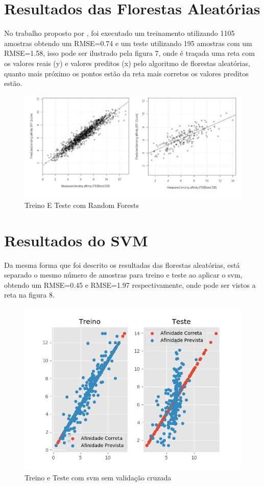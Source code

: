 \documentclass[tcc, capa]{texucpel}
\begin{document}
\section{Resultados das Florestas Aleatórias}

No trabalho proposto por \textbf{\cite{ballester2010machine}}, foi executado um treinamento utilizando 1105 amostras obtendo um RMSE=0.74 e um teste utilizando 195 amostras com um RMSE=1.58, isso pode ser ilustrado pela figura 7, onde é traçada uma reta com os valores reais (y) e valores preditos (x) pelo algoritmo de florestas aleatórias, quanto mais próximo os pontos estão da reta mais corretos os valores preditos estão.
    \begin{figure}[h]
	\centering\includegraphics[width=17cm]{imagens/treino_teste_ballester.png}
	\caption{Treino E Teste com Random Forests}
	\end{figure}
    \FloatBarrier

\section{Resultados do SVM}

Da mesma forma que foi descrito os resultadas das florestas aleatórias, está separado o mesmo número de amostras para treino e teste ao aplicar o svm, obtendo um RMSE=0.45 e RMSE=1.97 respectivamente, onde pode ser vistos a reta na figura 8.
	\begin{figure}[!h]
	\centering
	\includegraphics[width=15cm]{imagens/teste_treino_meu.png}
	\caption{Treino e Teste com svm sem validação cruzada}
	\end{figure}
    \FloatBarrier
    
\end{document}
